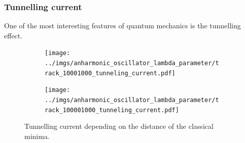 \documentclass{scrartcl}
\begin{document}
	\subsubsection{Tunnelling current}
		One of the most interesting features of quantum mechanics is the tunnelling effect.
		\begin{figure}[H]
			\centering
				\begin{subfigure}[c]{0.49\textwidth}
					\texttt{[image: ../imgs/anharmonic\_oscillator\_lambda\_parameter/track\_10001000\_tunneling\_current.pdf]}
					\label{fig:track_10001000_tunneling_current}
				\end{subfigure}
				\begin{subfigure}[c]{0.49\textwidth}
					\texttt{[image: ../imgs/anharmonic\_oscillator\_lambda\_parameter/track\_100001000\_tunneling\_current.pdf]}
					\label{fig:track_100001000_tunneling_current}
				\end{subfigure}
			\caption{Tunnelling current depending on the distance of the classical minima.}
			\label{fig:anharmonic_oscillator_tunneling_current}
		\end{figure}
\end{document}
